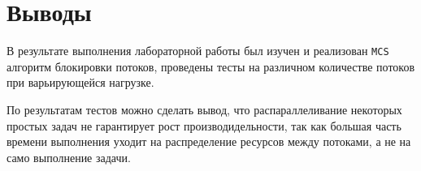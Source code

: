 \section{Выводы}

В результате выполнения лабораторной работы был изучен
и реализован
\verb|MCS| алгоритм блокировки потоков,
проведены тесты на различном количестве потоков
при варьирующейся нагрузке.

По результатам тестов можно сделать вывод,
что распараллеливание некоторых простых задач
не гарантирует рост производидельности, так как 
большая часть времени выполнения уходит
на распределение ресурсов между потоками,
а не на само выполнение задачи.